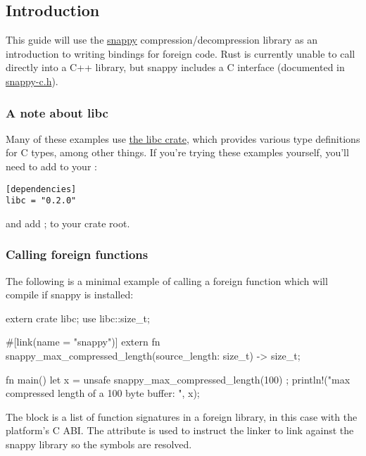 \subsection*{Introduction}

This guide will use the \href{https://github.com/google/snappy}{snappy} compression/decompression library as an introduction 
to writing bindings for foreign code. Rust is currently unable to call directly into a C++ library, but snappy includes a C 
interface (documented in \href{https://github.com/google/snappy/blob/master/snappy-c.h}{snappy-c.h}).

\subsubsection*{A note about libc}

Many of these examples use \href{https://crates.io/crates/libc}{the libc crate}, which provides various type definitions for 
C types, among other things. If you’re trying these examples yourself, you’ll need to add  to your :

\begin{verbatim}
[dependencies]
libc = "0.2.0"
\end{verbatim}

and add ; to your crate root.

\subsubsection*{Calling foreign functions}

The following is a minimal example of calling a foreign function which will compile if snappy is installed:

\begin{rustc}
extern crate libc;
use libc::size_t;

#[link(name = "snappy")]
extern {
    fn snappy_max_compressed_length(source_length: size_t) -> size_t;
}

fn main() {
    let x = unsafe { snappy_max_compressed_length(100) };
    println!("max compressed length of a 100 byte buffer: {}", x);
}
\end{rustc}

The  block is a list of function signatures in a foreign library, in this case with the platform's C ABI. 
The \code{\#[link(...)]} attribute is used to instruct the linker to link against the snappy library so the symbols are 
resolved.

